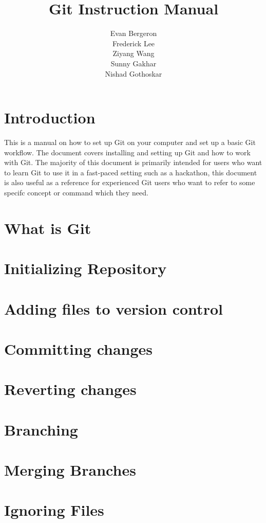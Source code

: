 \documentclass{amsart}
\title{Git Instruction Manual}
\author{Evan Bergeron\\
Frederick Lee\\
Ziyang Wang\\
Sunny Gakhar\\
Nishad Gothoskar}
\begin{document}
\maketitle

\tableofcontents
\section*{Introduction}

This is a manual on how to set up Git on your computer and set up a basic Git workflow. The document covers installing and setting up Git and how to work with Git. The majority of this document is primarily intended for users who want to learn Git to use it in a fast-paced setting such as a hackathon, this document is also useful as a reference for experienced Git users who want to refer to some specifc concept or command which they need.

\section*{What is Git}

\section*{Initializing Repository}

\section*{Adding files to version control}

\section*{Committing changes}

\section*{Reverting changes}

\section*{Branching}

\section*{Merging Branches}

\section*{Ignoring Files}
\end{document}
